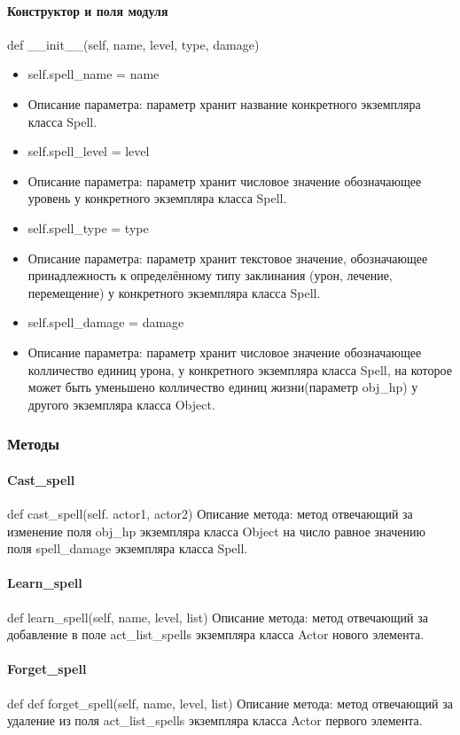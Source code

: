 \paragraph{Конструктор и поля модуля}
def \_\_init\_\_(self, name, level, type, damage)
\begin{itemize}
	\item self.spell\_name = name
	\item Описание параметра: параметр хранит название конкретного экземпляра класса Spell.
	\item self.spell\_level = level
	\item Описание параметра: параметр хранит числовое значение обозначающее уровень у конкретного экземпляра класса Spell.
	\item self.spell\_type = type
	\item Описание параметра: параметр хранит текстовое значение, обозначающее принадлежность к определённому типу заклинания (урон, лечение, перемещение) у конкретного экземпляра класса Spell.
	\item self.spell\_damage = damage
	\item Описание параметра: параметр хранит числовое значение обозначающее колличество единиц урона, у конкретного экземпляра класса Spell, на которое может быть уменьшено колличество единиц жизни(параметр obj\_hp) у другого экземпляра класса Object.

\end{itemize}
\subsubsection{Методы}
\paragraph{Cast\_spell}
def cast\_spell(self. actor1, actor2)
Описание метода: метод отвечающий за изменение поля obj\_hp экземпляра класса Object на число равное значению поля spell\_damage экземпляра класса Spell.
\paragraph{Learn\_spell}
def learn\_spell(self, name, level, list)
Описание метода: метод отвечающий за добавление в поле act\_list\_spells экземпляра класса Actor нового элемента.
\paragraph{Forget\_spell}
def def forget\_spell(self, name, level, list)
Описание метода: метод отвечающий за удаление из поля act\_list\_spells экземпляра класса Actor первого элемента.

